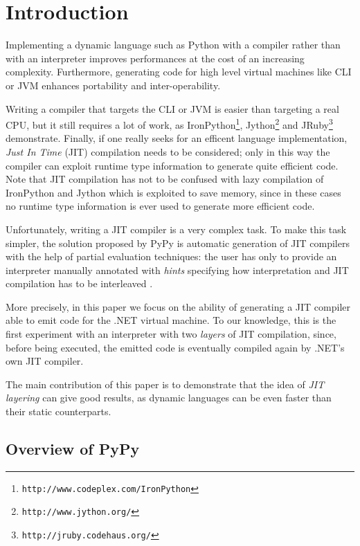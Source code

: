 \section{Introduction}
Implementing a dynamic language such as Python with a compiler rather than with an interpreter improves performances at the cost of
an increasing complexity. Furthermore, generating code for high level virtual machines like CLI or JVM enhances portability and inter-operability.

Writing a compiler that targets the CLI or JVM is easier than targeting a real CPU, but
it still requires a lot of work, as IronPython\footnote{\texttt{http://www.codeplex.com/IronPython}},
Jython\footnote{\texttt{http://www.jython.org/}} and JRuby\footnote{\texttt{http://jruby.codehaus.org/}} demonstrate.
Finally, if one really seeks for an efficent language implementation, \emph{Just In Time} (JIT) compilation needs
to be considered; only in this way  the compiler can exploit runtime type
information to generate quite efficient code. Note that JIT compilation
has not to be confused with lazy compilation of IronPython and Jython which is exploited to save memory, 
since in these cases no runtime type information is ever used to generate more efficient code.

Unfortunately, writing a JIT compiler is a very complex task.  
To make this task simpler, the solution proposed by PyPy \cite{RiBo07_223}  
is automatic generation of JIT compilers with the help of partial evaluation techniques: 
the user has only to provide an interpreter manually annotated with \emph{hints}
specifying how interpretation and JIT compilation has to be interleaved \cite{PyPyJIT09}.

More precisely, in this paper we focus on the ability of generating a JIT compiler able to emit code
for the .NET virtual machine. To our knowledge, this is the first experiment with an interpreter with
two \emph{layers} of JIT compilation, since, before being executed, the
emitted code is eventually compiled again by .NET's own JIT compiler.

The main contribution of this paper is to demonstrate that the idea of
\emph{JIT layering} can give good results, as dynamic languages can be even
faster than their static counterparts.

\subsection{Overview of PyPy}

